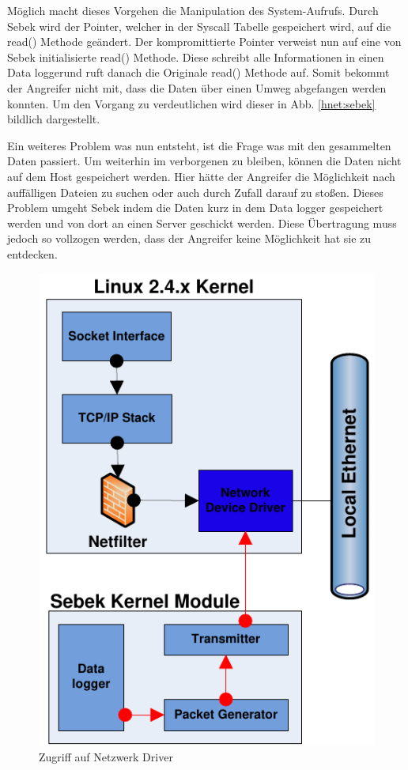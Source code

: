 Möglich macht dieses Vorgehen die Manipulation des System-Aufrufs. Durch Sebek wird der Pointer, welcher in der Syscall Tabelle gespeichert wird, auf die read() Methode geändert. Der kompromittierte Pointer verweist nun auf eine von Sebek initialisierte read() Methode. Diese schreibt alle Informationen in einen \grqq Data logger\grqq und ruft danach die Originale read() Methode auf. Somit bekommt der Angreifer nicht mit, dass die Daten über einen Umweg abgefangen werden konnten. Um den Vorgang zu verdeutlichen wird dieser in Abb. \ref{hnet:sebek} bildlich dargestellt.

Ein weiteres Problem was nun entsteht, ist die Frage was mit den gesammelten Daten passiert. Um weiterhin im verborgenen zu bleiben, können die Daten nicht auf dem Host gespeichert werden. Hier hätte der Angreifer die Möglichkeit nach auffälligen Dateien zu suchen oder auch durch Zufall darauf zu stoßen. Dieses Problem umgeht Sebek indem die Daten kurz in dem Data logger gespeichert werden und von dort an einen Server geschickt werden. Diese Übertragung muss jedoch so vollzogen werden, dass der Angreifer keine Möglichkeit hat sie zu entdecken.
\begin{figure}[ht]
    \centering\includegraphics[scale=0.70]{Bilder/sebek_Network_Driver.pdf}
  \caption{Zugriff auf Netzwerk Driver\cite{project.2003b}}
  \label{hnet:sebekDriver}
\end{figure}
